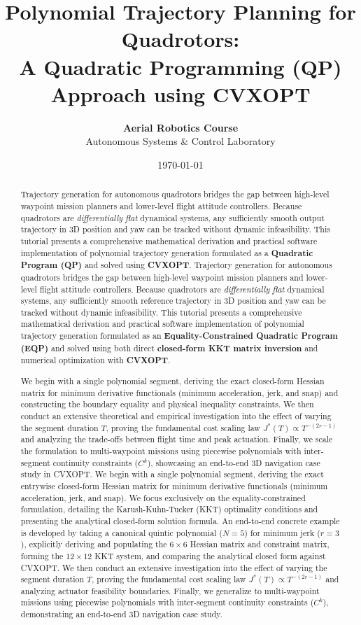 \documentclass[11pt,a4paper]{article}
\title{\textbf{\LARGE Polynomial Trajectory Planning for Quadrotors:}\\[0.4em]
\Large A Quadratic Programming (QP) Approach using CVXOPT}
\author{\textbf{Aerial Robotics Course} \\
Autonomous Systems \& Control Laboratory}
\date{\today}
\begin{document}
\maketitle

\begin{abstract}
Trajectory generation for autonomous quadrotors bridges the gap between high-level waypoint mission planners and lower-level flight attitude controllers. Because quadrotors are \emph{differentially flat} dynamical systems, any sufficiently smooth output trajectory in 3D position and yaw can be tracked without dynamic infeasibility. This tutorial presents a comprehensive mathematical derivation and practical software implementation of polynomial trajectory generation formulated as a \textbf{Quadratic Program (QP)} and solved using \textbf{CVXOPT}.
Trajectory generation for autonomous quadrotors bridges the gap between high-level waypoint mission planners and lower-level flight attitude controllers. Because quadrotors are \emph{differentially flat} dynamical systems, any sufficiently smooth reference trajectory in 3D position and yaw can be tracked without dynamic infeasibility. This tutorial presents a comprehensive mathematical derivation and practical software implementation of polynomial trajectory generation formulated as an \textbf{Equality-Constrained Quadratic Program (EQP)} and solved using both direct \textbf{closed-form KKT matrix inversion} and numerical optimization with \textbf{CVXOPT}.

We begin with a single polynomial segment, deriving the exact closed-form Hessian matrix for minimum derivative functionals (minimum acceleration, jerk, and snap) and constructing the boundary equality and physical inequality constraints. We then conduct an extensive theoretical and empirical investigation into the effect of varying the segment duration $T$, proving the fundamental cost scaling law $J^*(T) \propto T^{-(2r-1)}$ and analyzing the trade-offs between flight time and peak actuation. Finally, we scale the formulation to multi-waypoint missions using piecewise polynomials with inter-segment continuity constraints ($C^k$), showcasing an end-to-end 3D navigation case study in CVXOPT.
We begin with a single polynomial segment, deriving the exact entrywise closed-form Hessian matrix for minimum derivative functionals (minimum acceleration, jerk, and snap). We focus exclusively on the equality-constrained formulation, detailing the Karush-Kuhn-Tucker (KKT) optimality conditions and presenting the analytical closed-form solution formula. An end-to-end concrete example is developed by taking a canonical quintic polynomial ($N=5$) for minimum jerk ($r=3$), explicitly deriving and populating the $6 \times 6$ Hessian matrix and constraint matrix, forming the $12 \times 12$ KKT system, and comparing the analytical closed form against CVXOPT. We then conduct an extensive investigation into the effect of varying the segment duration $T$, proving the fundamental cost scaling law $J^*(T) \propto T^{-(2r-1)}$ and analyzing actuator feasibility boundaries. Finally, we generalize to multi-waypoint missions using piecewise polynomials with inter-segment continuity constraints ($C^k$), demonstrating an end-to-end 3D navigation case study.
\end{abstract}
\end{document}
